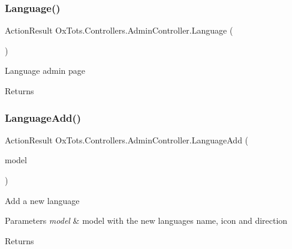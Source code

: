 \subsubsection{\texorpdfstring{Language()}{Language()}}
{\footnotesize\ttfamily Action\+Result Ox\+Tots.\+Controllers.\+Admin\+Controller.\+Language (\begin{DoxyParamCaption}{ }\end{DoxyParamCaption})\hspace{0.3cm}{\ttfamily [inline]}}



Language admin page 

\begin{DoxyReturn}{Returns}

\end{DoxyReturn}
\mbox{\label{class_ox_tots_1_1_controllers_1_1_admin_controller_a42ef443e84ddb7761c994fea092b8565}} 
\subsubsection{\texorpdfstring{LanguageAdd()}{LanguageAdd()}}
{\footnotesize\ttfamily Action\+Result Ox\+Tots.\+Controllers.\+Admin\+Controller.\+Language\+Add (\begin{DoxyParamCaption}\item[{Admin\+Language\+View\+Model}]{model }\end{DoxyParamCaption})\hspace{0.3cm}{\ttfamily [inline]}}



Add a new language 


\begin{DoxyParams}{Parameters}
{\em model} & model with the new language\textquotesingle{}s name, icon and direction\\
\hline
\end{DoxyParams}
\begin{DoxyReturn}{Returns}

\end{DoxyReturn}
\mbox{\label{class_ox_tots_1_1_controllers_1_1_admin_controller_af0ec3d77f9da1d2496ef9f9a194ebb4e}} 
